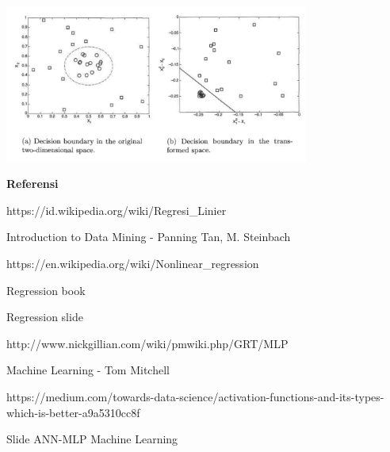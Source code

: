 \documentclass[12pt]{article}%
\begin{document}
\begin{enumerate}
	\par \includegraphics[width=10cm]{svm-transform} 

\end{enumerate}

\par \textbf{Referensi}
\par [1] https://id.wikipedia.org/wiki/Regresi_Linier
\par [2] Introduction to Data Mining - Panning Tan, M. Steinbach
\par [3] https://en.wikipedia.org/wiki/Nonlinear_regression
\par [4] Regression book
\par [5] Regression slide
\par [6] http://www.nickgillian.com/wiki/pmwiki.php/GRT/MLP
\par [7] Machine Learning - Tom Mitchell
\par [8] https://medium.com/towards-data-science/activation-functions-and-its-types-which-is-better-a9a5310cc8f
\par [9] Slide ANN-MLP Machine Learning
\end{document}
